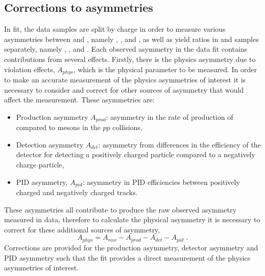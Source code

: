 \begin{table}[h]
\centering
{}
\caption{Summary of the veto efficiencies used in the \CP fit.}
\label{vetoeff}
\end{table}

\subsection{Corrections to asymmetries}
\label{sec:cpfit:asymmetries}

In \CP fit, the data samples are split by charge in order to measure various asymmetries between \Bp and \Bm, namely \Akpi, \Akk, \Apipi and \Apipipipi, as well as yield ratios in \Bp and \Bm samples separately, namely \Rptwo, \Rmtwo, \Rpfour and \Rmfour. Each observed asymmetry in the data fit contains contributions from several effects. Firstly, there is the physics asymmetry due to \CP violation effects, $A_{phys}$, which is the physical parameter to be measured. In order to make an accurate measurement of the physics asymmetries of interest it is necessary to consider and correct for other sources of asymmetry that would affect the measurement. These asymmetries are:
\begin{itemize}
\item Production asymmetry $A_{prod}$: asymmetry in the rate of production of \Bp compared to \Bm mesons in the $pp$ collisions,
\item Detection asymmetry $A_{det}$: asymmetry from differences in the efficiency of the detector for detecting a positively charged particle compared to a negatively charge particle,
\item PID asymmetry, $A_{pid}$: asymmetry in PID efficiencies between positively charged and negatively charged tracks.
\end{itemize}
These asymmetries all contribute to produce the raw observed asymmetry measured in data, therefore to calculate the physical asymmetry it is necessary to correct for these additional sources of asymmetry,
\begin{equation}
A_{phys} = A_{raw} - A_{prod} - A_{det} - A_{pid} \text{ .}
\label{asymmetries}
\end{equation} 
Corrections are provided for the production asymmetry, detector asymmetry and PID asymmetry such that the \CP fit provides a direct measurement of the physics asymmetries of interest.

